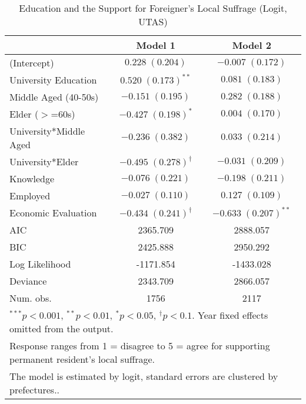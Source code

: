 
\begin{table}
\caption{Education and the Support for Foreigner's Local Suffrage (Logit, UTAS)}
\begin{center}
\begin{tabular}{l c c }
\toprule
 & Model 1 & Model 2 \\
\midrule
(Intercept)            & $0.228 \; (0.204)$            & $-0.007 \; (0.172)$      \\
University Education   & $0.520 \; (0.173)^{**}$       & $0.081 \; (0.183)$       \\
Middle Aged (40-50s)   & $-0.151 \; (0.195)$           & $0.282 \; (0.188)$       \\
Elder ($>$=60s)        & $-0.427 \; (0.198)^{*}$       & $0.004 \; (0.170)$       \\
University*Middle Aged & $-0.236 \; (0.382)$           & $0.033 \; (0.214)$       \\
University*Elder       & $-0.495 \; (0.278)^{\dagger}$ & $-0.031 \; (0.209)$      \\
Knowledge              & $-0.076 \; (0.221)$           & $-0.198 \; (0.211)$      \\
Employed               & $-0.027 \; (0.110)$           & $0.127 \; (0.109)$       \\
Economic Evaluation    & $-0.434 \; (0.241)^{\dagger}$ & $-0.633 \; (0.207)^{**}$ \\
\midrule
AIC                    & 2365.709                      & 2888.057                 \\
BIC                    & 2425.888                      & 2950.292                 \\
Log Likelihood         & -1171.854                     & -1433.028                \\
Deviance               & 2343.709                      & 2866.057                 \\
Num. obs.              & 1756                          & 2117                     \\
\bottomrule
\multicolumn{3}{l}{\scriptsize{$^{***}p<0.001$, $^{**}p<0.01$, $^*p<0.05$, $^{\dagger}p<0.1$. Year fixed effects omitted from the output.}} \\ \multicolumn{3}{l}{\scriptsize{Response ranges from 1 = disagree to 5 = agree for supporting permanent resident's local suffrage.}} \\ \multicolumn{3}{l}{\scriptsize{The model is estimated by logit, standard errors are clustered by prefectures..}}
\end{tabular}
\label{lgtab_umo}
\end{center}
\end{table}

